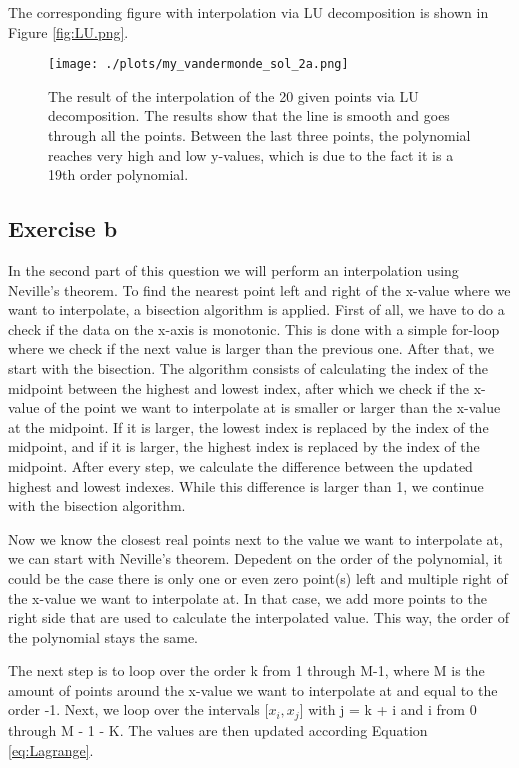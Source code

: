 The corresponding figure with interpolation via LU decomposition is shown in Figure \ref{fig:LU.png}. 

\begin{figure}[h!]
  \centering
  \texttt{[image: ./plots/my\_vandermonde\_sol\_2a.png]}
  \caption{The result of the interpolation of the 20 given points via LU decomposition. The results show that the line is smooth and goes through all the points. Between the last three points, the polynomial reaches very high and low y-values, which is due to the fact it is a 19th order polynomial.}
  \label{fig:2a}
\end{figure}

\subsection{Exercise b}
In the second part of this question we will perform an interpolation using Neville's theorem. To find the nearest point left and right of the x-value where we want to interpolate, a bisection algorithm is applied. First of all, we have to do a check if the data on the x-axis is monotonic. This is done with a simple for-loop where we check if the next value is larger than the previous one. After that, we start with the bisection.
The algorithm consists of calculating the index of the midpoint between the highest and lowest index, after which we check if the x-value of the point we want to interpolate at is smaller or larger than the x-value at the midpoint. If it is larger, the lowest index is replaced by the index of the midpoint, and if it is larger, the highest index is replaced by the index of the midpoint. After every step, we calculate the difference between the updated highest and lowest indexes. While this difference is larger than 1, we continue with the bisection algorithm. 

Now we know the closest real points next to the value we want to interpolate at, we can start with Neville's theorem. Depedent on the order of the polynomial, it could be the case there is only one or even zero point(s) left and multiple right of the x-value we want to interpolate at. In that case, we add more points to the right side that are used to calculate the interpolated value. This way, the order of the polynomial stays the same.

The next step is to loop over the order k from 1 through M-1, where M is the amount of points around the x-value we want to interpolate at and equal to the order -1. Next, we loop over the intervals [$x_i, x_j$] with j = k + i and i from 0 through M - 1 - K. The values are then updated according Equation \ref{eq:Lagrange}.

